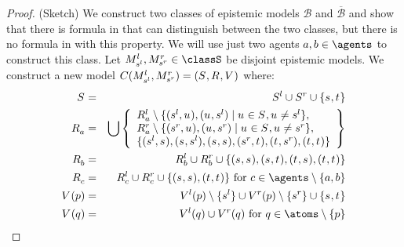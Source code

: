 \begin{proof}{(Sketch)} 
    We construct two classes of epistemic models $\mathcal{B}$ and $\overline{\mathcal{B}}$ and show that there is formula in \langApal{} that can distinguish between the two classes, but there is no formula in \langPapal{} with this property. 
    We will use just two agents $\agentA, \agentB \in \agents$ to construct this class.
    Let $\kPModel[l]{\kStateS[l]}, \kPModel[r]{\kStateS[r]} \in \classS$ be disjoint epistemic models. 
    We construct a new model $C(\kPModel[l]{\kStateS[l]},\kPModel[r]{\kStateS[r]}) = \kModelTuple$ where:
    \begin{eqnarray*}
        \kStates &=& \kStates[l] \cup \kStates[r] \cup \{\kStateS, \kStateT\}\\
        \kAccessibility{\agentA} &=& \bigcup \left\{ \begin{array}{l}
                \kAccessibility[l]{\agentA} \setminus \{(\kStateS[l], \kStateU), (\kStateU, \kStateS[l]) \mid \kStateU \in \kStates, \kStateU \neq \kStateS[l]\},\\
                \kAccessibility[r]{\agentA} \setminus \{(\kStateS[r], \kStateU), (\kStateU, \kStateS[r]) \mid \kStateU \in \kStates, \kStateU \neq \kStateS[r]\},\\
                \{(\kStateS[l], \kStateS), (\kStateS, \kStateS[l]), (\kStateS, \kStateS),
                  (\kStateS[r], \kStateT), (\kStateT, \kStateS[r]), (\kStateT, \kStateT)\}
            \end{array}\right\}\\
        \kAccessibility{\agentB} &=& \kAccessibility[l]{\agentB} \cup \kAccessibility[r]{\agentB} \cup \{(\kStateS, \kStateS), (\kStateS, \kStateT), (\kStateT, \kStateS), (\kStateT, \kStateT)\}\\
        \kAccessibility{\agentC} &=& \kAccessibility[l]{\agentC} \cup \kAccessibility[r]{\agentC} \cup \{(\kStateS, \kStateS), (\kStateT, \kStateT)\} \text{ for } \agentC \in \agents \setminus \{\agentA, \agentB\}\\
        \kValuation(\atomP) &=& \kValuation[l](\atomP) \setminus \{\kStateS[l]\} \cup \kValuation[r](\atomP) \setminus \{\kStateS[r]\} \cup \{\kStateS, \kStateT\}\\
        \kValuation(\atomQ) &=& \kValuation[l](\atomQ) \cup \kValuation[r](\atomQ) \text{ for } \atomQ \in \atoms \setminus \{\atomP\}
    \end{eqnarray*}


\end{proof}
